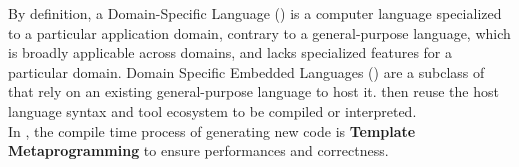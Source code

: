 \documentclass[../../main.tex]{subfiles}
\begin{document}
By definition, a Domain-Specific Language (\dsl) is a computer language
specialized to a particular application domain, contrary to a general-purpose
language, which is broadly applicable across domains, and lacks specialized
features for a particular domain. Domain Specific Embedded Languages (\dsels)
are a subclass of \dsl that rely on an existing general-purpose language to host
it. \dsels then reuse the host language syntax and tool ecosystem to be compiled
or interpreted.\\

In \cpp, the compile time process of generating new code is \textbf{Template
Metaprogramming} to ensure performances and correctness.


%
%
\end{document}

